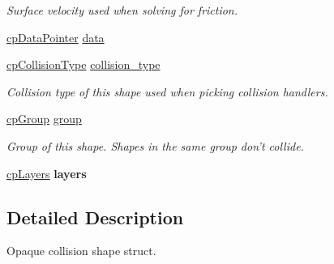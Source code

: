 \begin{DoxyCompactItemize}
\begin{DoxyCompactList}\small\item\em Surface velocity used when solving for friction. \end{DoxyCompactList}\item 
\hyperlink{group__basic_types_ga2ac2c3c31e21893941f9e4f8ee279447}{cp\-Data\-Pointer} \hyperlink{structcp_shape_a25736bb8b57bfd8b73a364b503a47f68}{data}
\item 
\hypertarget{structcp_shape_ad6615f8cee565b76166a32ca11581054}{\hyperlink{group__basic_types_gae83e2f50965eb441e36ffff1e32e6d02}{cp\-Collision\-Type} \hyperlink{structcp_shape_ad6615f8cee565b76166a32ca11581054}{collision\-\_\-type}}\label{structcp_shape_ad6615f8cee565b76166a32ca11581054}

\begin{DoxyCompactList}\small\item\em Collision type of this shape used when picking collision handlers. \end{DoxyCompactList}\item 
\hypertarget{structcp_shape_a2e6aaffa5f4107eda1718e4f69628fc1}{\hyperlink{group__basic_types_gacd811b1135a8f4a3e5cc019552b18b1a}{cp\-Group} \hyperlink{structcp_shape_a2e6aaffa5f4107eda1718e4f69628fc1}{group}}\label{structcp_shape_a2e6aaffa5f4107eda1718e4f69628fc1}

\begin{DoxyCompactList}\small\item\em Group of this shape. Shapes in the same group don't collide. \end{DoxyCompactList}\item 
\hypertarget{structcp_shape_a8c5c82ec513ab15ed7da65fbb6a1b78d}{\hyperlink{group__basic_types_ga5ec31e87ed3973cab80f9bfbbbcb43bb}{cp\-Layers} {\bfseries layers}}\label{structcp_shape_a8c5c82ec513ab15ed7da65fbb6a1b78d}

\end{DoxyCompactItemize}


\subsection{Detailed Description}
Opaque collision shape struct. 

